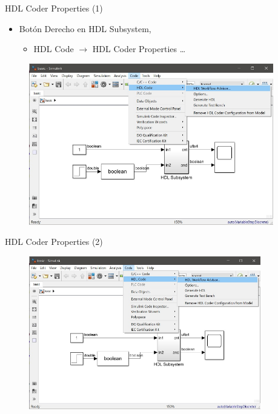 \documentclass{beamer}
\begin{document}
\begin{frame}{HDL Coder Properties (1)}
\begin{itemize}
	\item Botón Derecho en HDL Subsystem, 
	\begin{itemize}
		\item HDL Code $\rightarrow$ HDL Coder Properties \ldots
	\end{itemize}
\end{itemize}
\vspace{-0.25em}
\begin{figure}
	\includegraphics[page=2, width=0.95\textwidth]{figs/figs.pdf}
\end{figure}
\end{frame}

\begin{frame}{HDL Coder Properties (2)}
\vspace{-0.25em}
\begin{figure}
	\includegraphics[page=3, width=0.9\textwidth]{figs/figs.pdf}
\end{figure}
\end{frame}
\end{document}
